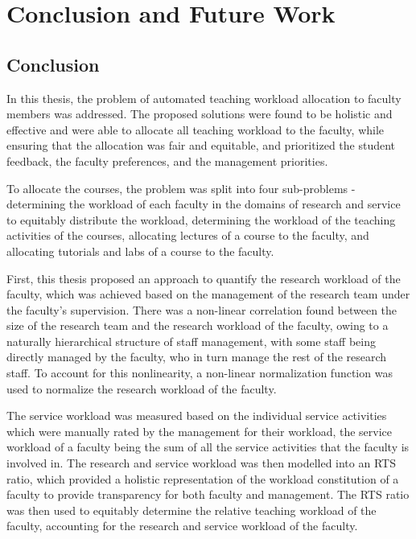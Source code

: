 \chapter{Conclusion and Future Work}

\section{Conclusion}

In this thesis, the problem of automated teaching workload allocation to faculty members was addressed. The proposed solutions were found to be holistic and effective and were able to allocate all teaching workload to the faculty, while ensuring that the allocation was fair and equitable, and prioritized the student feedback, the faculty preferences, and the management priorities.

To allocate the courses, the problem was split into four sub-problems - determining the workload of each faculty in the domains of research and service to equitably distribute the workload, determining the workload of the teaching activities of the courses, allocating lectures of a course to the faculty, and allocating tutorials and labs of a course to the faculty.

First, this thesis proposed an approach to quantify the research workload of the faculty, which was achieved based on the management of the research team under the faculty's supervision. There was a non-linear correlation found between the size of the research team and the research workload of the faculty, owing to a naturally hierarchical structure of staff management, with some staff being directly managed by the faculty, who in turn manage the rest of the research staff. To account for this nonlinearity, a non-linear normalization function was used to normalize the research workload of the faculty.

The service workload was measured based on the individual service activities which were manually rated by the management for their workload, the service workload of a faculty being the sum of all the service activities that the faculty is involved in. The research and service workload was then modelled into an RTS ratio, which provided a holistic representation of the workload constitution of a faculty to provide transparency for both faculty and management. The RTS ratio was then used to equitably determine the relative teaching workload of the faculty, accounting for the research and service workload of the faculty.

